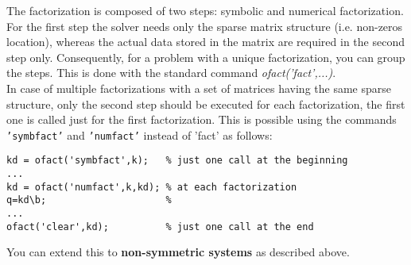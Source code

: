 The factorization is composed of two steps: symbolic and numerical factorization. For the first step the solver needs only the sparse matrix structure (i.e. non-zeros location), whereas the actual data stored in the matrix are required in the second step only. Consequently, for a problem with a unique factorization, you can group the steps. This is done with the standard command \emph {ofact('fact',...)}.\\
In case of multiple factorizations with a set of matrices having the same sparse structure, only the second step should be executed for each factorization, the first one is called just for the first factorization. This is possible using the commands {\tt 'symbfact'} and {\tt 'numfact'} instead of 'fact' as follows:

\begin{verbatim}
kd = ofact('symbfact',k);   % just one call at the beginning
...
kd = ofact('numfact',k,kd); % at each factorization
q=kd\b;                     %
...
ofact('clear',kd);          % just one call at the end
\end{verbatim} 

You can extend this to {\bf non-symmetric systems} as described above.\\

